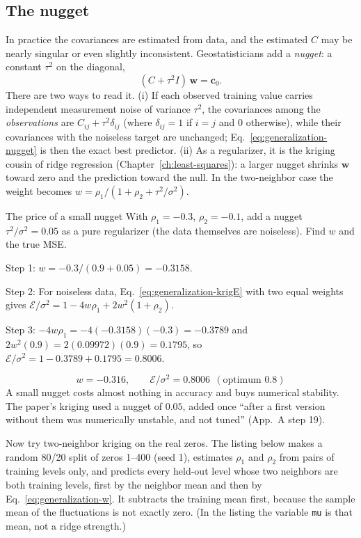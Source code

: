 \subsection{The nugget}

In practice the covariances are estimated from data, and the estimated $C$ may be nearly singular or even slightly inconsistent. Geostatisticians add a \emph{nugget}: a constant $\tau^2$ on the diagonal,
\begin{equation}
(C+\tau^2I)\,\bm w=\bm c_0.
\label{eq:generalization-nugget}
\end{equation}
There are two ways to read it. (i) If each observed training value carries independent measurement noise of variance $\tau^2$, the covariances among the \emph{observations} are $C_{ij}+\tau^2\delta_{ij}$ (where $\delta_{ij}=1$ if $i=j$ and $0$ otherwise), while their covariances with the noiseless target are unchanged; Eq.~\eqref{eq:generalization-nugget} is then the exact best predictor. (ii) As a regularizer, it is the kriging cousin of ridge regression (Chapter~\ref{ch:least-squares}): a larger nugget shrinks $\bm w$ toward zero and the prediction toward the null. In the two-neighbor case the weight becomes $w=\rho_1/(1+\rho_2+\tau^2/\sigma^2)$.

\begin{sample}{The price of a small nugget}
With $\rho_1=-0.3$, $\rho_2=-0.1$, add a nugget $\tau^2/\sigma^2=0.05$ as a pure regularizer (the data themselves are noiseless). Find $w$ and the true MSE.

Step 1: $w=-0.3/(0.9+0.05)=-0.3158$.

Step 2: For noiseless data, Eq.~\eqref{eq:generalization-krigE} with two equal weights gives $\mathcal E/\sigma^2=1-4w\rho_1+2w^2(1+\rho_2)$.

Step 3: $-4w\rho_1=-4(-0.3158)(-0.3)=-0.3789$ and $2w^2(0.9)=2(0.09972)(0.9)=0.1795$, so $\mathcal E/\sigma^2=1-0.3789+0.1795=0.8006$.

\[
\boxed{w=-0.316,\qquad \mathcal E/\sigma^2=0.8006\ \ (\text{optimum }0.8)}
\]
A small nugget costs almost nothing in accuracy and buys numerical stability. The paper's kriging used a nugget of $0.05$, added once ``after a first version without them was numerically unstable, and not tuned'' (App.~A step 19).
\end{sample}

Now try two-neighbor kriging on the real zeros. The listing below makes a random 80/20 split of zeros 1--400 (seed 1), estimates $\rho_1$ and $\rho_2$ from pairs of training levels only, and predicts every held-out level whose two neighbors are both training levels, first by the neighbor mean and then by Eq.~\eqref{eq:generalization-w}. It subtracts the training mean first, because the sample mean of the fluctuations is not exactly zero. (In the listing the variable \texttt{mu} is that mean, not a ridge strength.)

